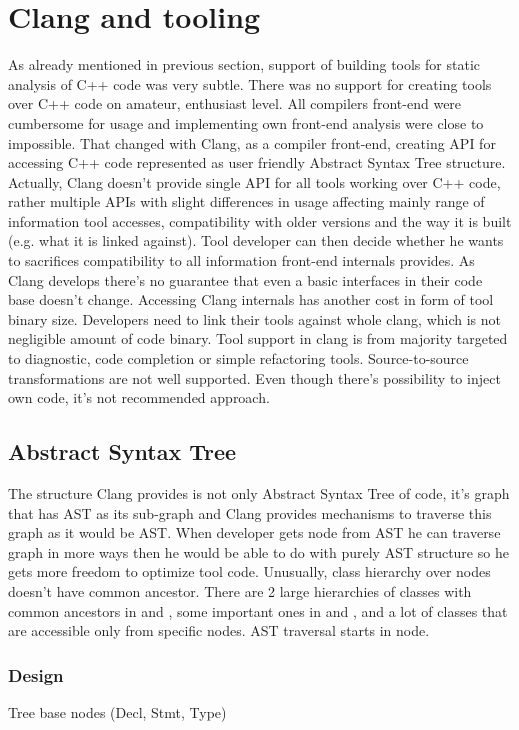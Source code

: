 \chapter{Clang and tooling}
As already mentioned in previous section, support of building tools for static analysis of C++ code was very subtle. There was no support for creating tools over C++ code on amateur, enthusiast level. All compilers front-end were cumbersome for usage and implementing own front-end analysis were close to impossible. That changed with Clang, as a compiler front-end, creating API for accessing C++ code represented as user friendly Abstract Syntax Tree structure. Actually, Clang doesn't provide single API for all tools working over C++ code, rather multiple APIs with slight differences in usage affecting mainly range of information tool accesses, compatibility with older versions and the way it is built (e.g. what it is linked against). Tool developer can then decide whether he wants to sacrifices compatibility to all information front-end internals provides. As Clang develops there's no guarantee that even a basic interfaces in their code base doesn't change. Accessing Clang internals has another cost in form of tool binary size. Developers need to link their tools against whole clang, which is not negligible amount of code binary. Tool support in clang is from majority targeted to diagnostic, code completion or simple refactoring tools. Source-to-source transformations are not well supported. Even though there's possibility to inject own code, it's not recommended approach.

\section{Abstract Syntax Tree}
The structure Clang provides is not only Abstract Syntax Tree of code, it's graph that has AST as its sub-graph and Clang provides mechanisms to traverse this graph as it would be AST. When developer gets node from AST he can traverse graph in more ways then he would be able to do with purely AST structure so he gets more freedom to optimize tool code. Unusually, class hierarchy over nodes doesn't have common ancestor. There are 2 large hierarchies of classes with common ancestors in  and , some important ones in  and , and a lot of classes that are accessible only from specific nodes. AST traversal starts in  node.

\subsection{Design}
Tree base nodes (Decl, Stmt, Type)


